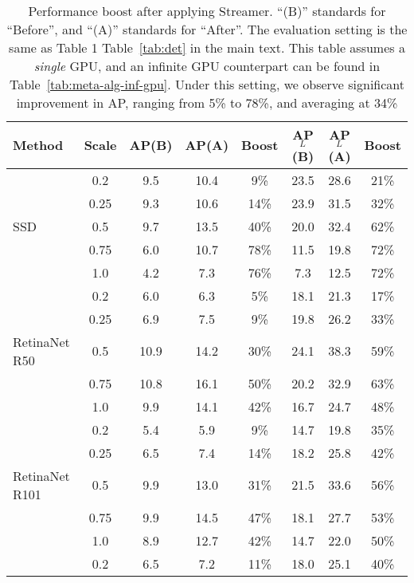 \begin{table*}[]
\small
\centering
\caption{Performance boost after applying Streamer. ``(B)'' standards for ``Before'', and ``(A)'' standards for ``After''. The evaluation setting is the same as
\ifstandalonesupplement
    Table 1 
\else
    Table~\ref{tab:det}
\fi
in the main text. This table assumes a {\em single} GPU, and an infinite GPU counterpart can be found in Table~\ref{tab:meta-alg-inf-gpu}. Under this setting, we observe significant improvement in AP, ranging from 5\% to 78\%, and averaging at 34\%
}
\label{tab:meta-alg-single-gpu} 
\addtolength{\tabcolsep}{0.2em}
\vspace{-0.5em}
\begin{tabular}{lccccccc}
\toprule
Method & Scale & AP(B) & AP(A) & Boost & AP$_L$(B) & AP$_L$(A) & Boost \\
\midrule
                   & 0.2  & 9.5  & 10.4 & 9\%  & 23.5 & 28.6 & 21\% \\
                   & 0.25 & 9.3  & 10.6 & 14\% & 23.9 & 31.5 & 32\% \\
SSD                & 0.5  & 9.7  & 13.5 & 40\% & 20.0 & 32.4 & 62\% \\
                   & 0.75 & 6.0  & 10.7 & 78\% & 11.5 & 19.8 & 72\% \\
                   & 1.0  & 4.2  & 7.3  & 76\% & 7.3  & 12.5 & 72\% \\
\midrule
                   & 0.2  & 6.0  & 6.3  & 5\%  & 18.1 & 21.3 & 17\% \\
                   & 0.25 & 6.9  & 7.5  & 9\%  & 19.8 & 26.2 & 33\% \\
RetinaNet R50      & 0.5  & 10.9 & 14.2 & 30\% & 24.1 & 38.3 & 59\% \\
                   & 0.75 & 10.8 & 16.1 & 50\% & 20.2 & 32.9 & 63\% \\
                   & 1.0  & 9.9  & 14.1 & 42\% & 16.7 & 24.7 & 48\% \\
\midrule
                   & 0.2  & 5.4  & 5.9  & 9\%  & 14.7 & 19.8 & 35\% \\
                   & 0.25 & 6.5  & 7.4  & 14\% & 18.2 & 25.8 & 42\% \\
RetinaNet R101     & 0.5  & 9.9  & 13.0 & 31\% & 21.5 & 33.6 & 56\% \\
                   & 0.75 & 9.9  & 14.5 & 47\% & 18.1 & 27.7 & 53\% \\
                   & 1.0  & 8.9  & 12.7 & 42\% & 14.7 & 22.0 & 50\% \\
\midrule
                   & 0.2  & 6.5  & 7.2  & 11\% & 18.0 & 25.1 & 40\% \\

\end{tabular}
\end{table*}
